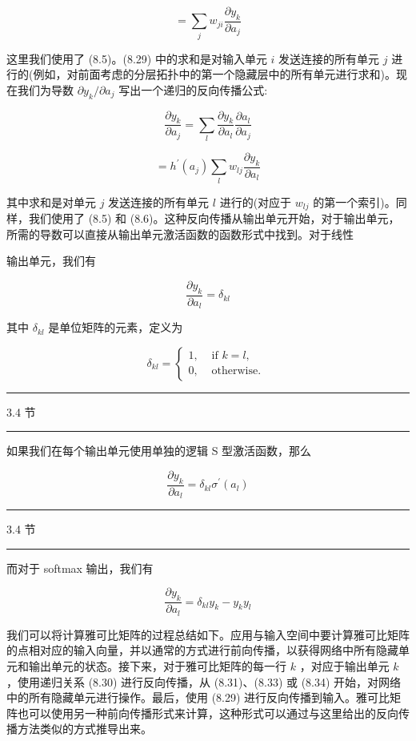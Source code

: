 \documentclass[10pt]{report}
\newcommand{\HRule}{\begin{center}\rule{0.9\linewidth}{0.2mm}\end{center}}
\begin{document}
\[
= \mathop{\sum }\limits_{j}{w}_{ji}\frac{\partial {y}_{k}}{\partial {a}_{j}} \tag{8.29}
\]

这里我们使用了 (8.5)。(8.29) 中的求和是对输入单元 \(i\) 发送连接的所有单元 \(j\) 进行的(例如，对前面考虑的分层拓扑中的第一个隐藏层中的所有单元进行求和)。现在我们为导数 \(\partial {y}_{k}/\partial {a}_{j}\) 写出一个递归的反向传播公式:

\[
\frac{\partial {y}_{k}}{\partial {a}_{j}} = \mathop{\sum }\limits_{l}\frac{\partial {y}_{k}}{\partial {a}_{l}}\frac{\partial {a}_{l}}{\partial {a}_{j}}
\]

\[
= {h}^{\prime }\left( {a}_{j}\right) \mathop{\sum }\limits_{l}{w}_{lj}\frac{\partial {y}_{k}}{\partial {a}_{l}} \tag{8.30}
\]

其中求和是对单元 \(j\) 发送连接的所有单元 \(l\) 进行的(对应于 \({w}_{lj}\) 的第一个索引)。同样，我们使用了 (8.5) 和 (8.6)。这种反向传播从输出单元开始，对于输出单元，所需的导数可以直接从输出单元激活函数的函数形式中找到。对于线性

输出单元，我们有

\[
\frac{\partial {y}_{k}}{\partial {a}_{l}} = {\delta }_{kl} \tag{8.31}
\]

其中 \({\delta }_{kl}\) 是单位矩阵的元素，定义为

\[
{\delta }_{kl} = \left\{  \begin{array}{ll} 1, & \text{ if }k = l, \\  0, & \text{ otherwise. } \end{array}\right.  \tag{8.32}
\]

\HRule

3.4 节

\HRule

如果我们在每个输出单元使用单独的逻辑 S 型激活函数，那么

\[
\frac{\partial {y}_{k}}{\partial {a}_{l}} = {\delta }_{kl}{\sigma }^{\prime }\left( {a}_{l}\right)  \tag{8.33}
\]

\HRule

3.4 节

\HRule

而对于 softmax 输出，我们有

\[
\frac{\partial {y}_{k}}{\partial {a}_{l}} = {\delta }_{kl}{y}_{k} - {y}_{k}{y}_{l} \tag{8.34}
\]

我们可以将计算雅可比矩阵的过程总结如下。应用与输入空间中要计算雅可比矩阵的点相对应的输入向量，并以通常的方式进行前向传播，以获得网络中所有隐藏单元和输出单元的状态。接下来，对于雅可比矩阵的每一行 \(k\) ，对应于输出单元 \(k\) ，使用递归关系 (8.30) 进行反向传播，从 (8.31)、(8.33) 或 (8.34) 开始，对网络中的所有隐藏单元进行操作。最后，使用 (8.29) 进行反向传播到输入。雅可比矩阵也可以使用另一种前向传播形式来计算，这种形式可以通过与这里给出的反向传播方法类似的方式推导出来。
\end{document}
